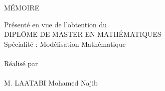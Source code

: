 \documentclass[12pt,a4paper]{report}%
\begin{document}
\begin{titlepage}
\begin{center}
	{\Huge\textcolor{MainRed}{M\'EMOIRE}}\\
	\bigskip
	
	{\large\textcolor{ufla_blue}{Présenté en vue de l'obtention du }}\\
	\bigskip
	{\Large\textcolor{winered}{ DIPL\^OME DE MASTER EN MATH\'EMATIQUES}}\\
	\bigskip
	{{\large Spécialité :} Modélisation Mathématique}
	\\\ \\
	{Réalisé par}\\\ \\
	{M. LAATABI Mohamed Najib}
	\medskip
\end{center}
\begin{center}

\textcolor{blue}{\shadowbox{
\begin{minipage}{10.5cm}\vspace{\baselineskip}
\begin{center}
\large\textcolor{black}{\bf Modèle stochastique du chémostat}\vspace{\baselineskip}
\end{center}
\end{minipage}}}


\normalsize


\end{center}
\end{titlepage}
\end{document}
